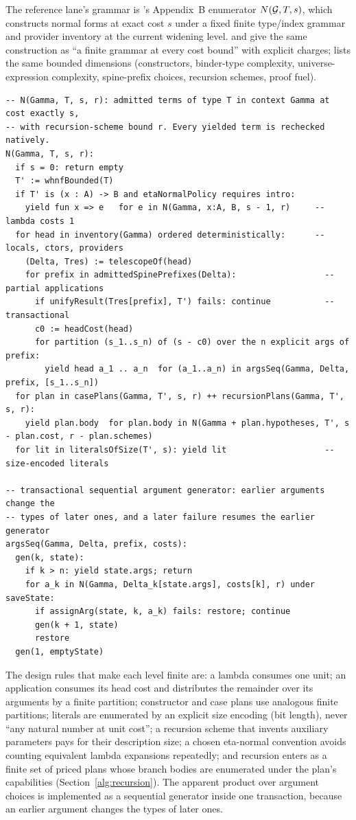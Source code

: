 The reference lane's grammar is 's Appendix~B enumerator $N(\mathcal{G},T,s)$, which constructs normal forms at exact cost $s$ under a fixed finite type/index grammar and provider inventory at the current widening level.  and  give the same construction as ``a finite grammar at every cost bound'' with explicit charges;  lists the same bounded dimensions (constructors, binder-type complexity, universe-expression complexity, spine-prefix choices, recursion schemes, proof fuel).
\begin{lstlisting}
-- N(Gamma, T, s, r): admitted terms of type T in context Gamma at cost exactly s,
-- with recursion-scheme bound r. Every yielded term is rechecked natively.
N(Gamma, T, s, r):
  if s = 0: return empty
  T' := whnfBounded(T)
  if T' is (x : A) -> B and etaNormalPolicy requires intro:
    yield fun x => e   for e in N(Gamma, x:A, B, s - 1, r)     -- lambda costs 1
  for head in inventory(Gamma) ordered deterministically:      -- locals, ctors, providers
    (Delta, Tres) := telescopeOf(head)
    for prefix in admittedSpinePrefixes(Delta):                  -- partial applications
      if unifyResult(Tres[prefix], T') fails: continue           -- transactional
      c0 := headCost(head)
      for partition (s_1..s_n) of (s - c0) over the n explicit args of prefix:
        yield head a_1 .. a_n  for (a_1..a_n) in argsSeq(Gamma, Delta, prefix, [s_1..s_n])
  for plan in casePlans(Gamma, T', s, r) ++ recursionPlans(Gamma, T', s, r):
    yield plan.body  for plan.body in N(Gamma + plan.hypotheses, T', s - plan.cost, r - plan.schemes)
  for lit in literalsOfSize(T', s): yield lit                    -- size-encoded literals

-- transactional sequential argument generator: earlier arguments change the
-- types of later ones, and a later failure resumes the earlier generator
argsSeq(Gamma, Delta, prefix, costs):
  gen(k, state):
    if k > n: yield state.args; return
    for a_k in N(Gamma, Delta_k[state.args], costs[k], r) under saveState:
      if assignArg(state, k, a_k) fails: restore; continue
      gen(k + 1, state)
      restore
  gen(1, emptyState)
\end{lstlisting}
The design rules that make each level finite are: a lambda consumes one unit; an application consumes its head cost and distributes the remainder over its arguments by a finite partition; constructor and case plans use analogous finite partitions; literals are enumerated by an explicit size encoding (bit length), never ``any natural number at unit cost''; a recursion scheme that invents auxiliary parameters pays for their description size; a chosen eta-normal convention avoids counting equivalent lambda expansions repeatedly; and recursion enters as a finite set of priced plans whose branch bodies are enumerated under the plan's capabilities (Section~\ref{alg:recursion}). The apparent product over argument choices is implemented as a sequential generator inside one transaction, because an earlier argument changes the types of later ones.

